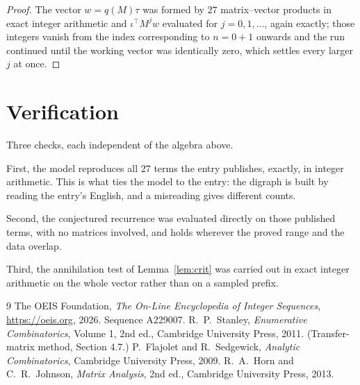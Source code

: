\documentclass[11pt,a4paper]{article}
\theoremstyle{plain}
\theoremstyle{definition}
\begin{document}
\begin{proof}
The vector $w=q(M)\tau$ was formed by $27$ matrix--vector products in exact integer
arithmetic and $\iota^{\!\top}M^{j}w$ evaluated for $j=0,1,\dots$, again exactly; those
integers vanish from the index corresponding to $n=0+1$ onwards and the run continued
until the working vector was identically zero, which settles every larger $j$ at once.
\end{proof}

\section{Verification}

Three checks, each independent of the algebra above.

First, the model reproduces all $27$ terms the entry publishes, exactly, in integer
arithmetic. This is what ties the model to the entry: the digraph is built by reading the
entry's English, and a misreading gives different counts.

Second, the conjectured recurrence was evaluated directly on those published terms, with no
matrices involved, and holds wherever the proved range and the data overlap.

Third, the annihilation test of Lemma~\ref{lem:crit} was carried out in exact integer
arithmetic on the whole vector rather than on a sampled prefix.

\begin{thebibliography}{9}
 The OEIS Foundation, \emph{The On-Line Encyclopedia of Integer
Sequences}, \url{https://oeis.org}, 2026. Sequence A229007.
 R.~P.~Stanley, \emph{Enumerative Combinatorics}, Volume 1, 2nd ed.,
Cambridge University Press, 2011. (Transfer-matrix method, Section 4.7.)
 P.~Flajolet and R.~Sedgewick, \emph{Analytic Combinatorics}, Cambridge
University Press, 2009.
 R.~A.~Horn and C.~R.~Johnson, \emph{Matrix Analysis}, 2nd ed., Cambridge
University Press, 2013.
\end{thebibliography}
\end{document}
